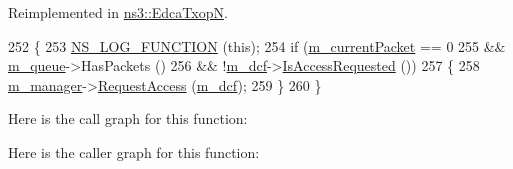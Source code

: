 Reimplemented in \hyperlink{classns3_1_1EdcaTxopN_a28a7052f217ed15058697197350d9801}{ns3\+::\+Edca\+TxopN}.


\begin{DoxyCode}
252 \{
253   \hyperlink{log-macros-disabled_8h_a90b90d5bad1f39cb1b64923ea94c0761}{NS\_LOG\_FUNCTION} (\textcolor{keyword}{this});
254   \textcolor{keywordflow}{if} (\hyperlink{classns3_1_1DcaTxop_a3c454c21337aac0944f86caad8b7a719}{m\_currentPacket} == 0
255       && \hyperlink{classns3_1_1DcaTxop_a7f42500857237f6f18aee436ef22ef62}{m\_queue}->HasPackets ()
256       && !\hyperlink{classns3_1_1DcaTxop_a16cc1f168ff78aabcf938e42996121c4}{m\_dcf}->\hyperlink{classns3_1_1DcfState_a1a9959645698b0f3d65902b0e382cfa2}{IsAccessRequested} ())
257     \{
258       \hyperlink{classns3_1_1DcaTxop_a7a58a717ab864b5d87e4392c69257dcf}{m\_manager}->\hyperlink{classns3_1_1DcfManager_a34f321cc7651b9bc9ac254af83521363}{RequestAccess} (\hyperlink{classns3_1_1DcaTxop_a16cc1f168ff78aabcf938e42996121c4}{m\_dcf});
259     \}
260 \}
\end{DoxyCode}


Here is the call graph for this function\+:




Here is the caller graph for this function\+:


